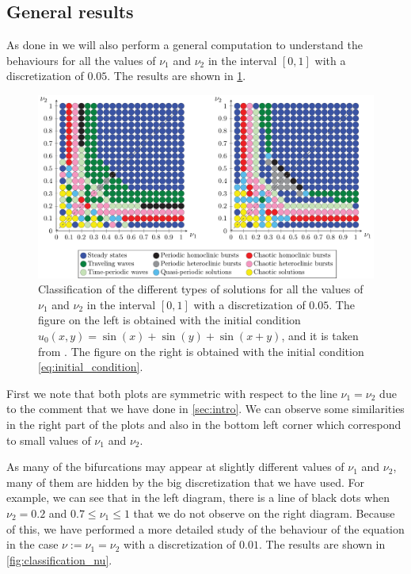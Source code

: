 \documentclass[twoside]{article}
\begin{document}
\subsection{General results}\label{sec:general_results}
As done in \cite{Kalogirou2015} we will also perform a general computation to understand the behaviours for all the values of $\nu_1$ and $\nu_2$ in the interval $[0,1]$ with a discretization of $0.05$. The results are shown in \cref{fig:classification_nu1_nu2}.

\begin{figure}[ht]
  \centering
  \includegraphics[width=\textwidth]{images/nu1-nu2.pdf}
  \caption{Classification of the different types of solutions for all the values of $\nu_1$ and $\nu_2$ in the interval $[0,1]$ with a discretization of $0.05$. The figure on the left is obtained with the initial condition $u_0(x,y) = \sin(x) + \sin(y) + \sin(x+y)$, and it is taken from \cite{Kalogirou2015}. The figure on the right is obtained with the initial condition \cref{eq:initial_condition}.}
  \label{fig:classification_nu1_nu2}
\end{figure}
First we note that both plots are symmetric with respect to the line $\nu_1=\nu_2$ due to the comment that we have done in \cref{sec:intro}. We can observe some similarities in the right part of the plots and also in the bottom left corner which correspond to small values of $\nu_1$ and $\nu_2$.

As many of the bifurcations may appear at slightly different values of $\nu_1$ and $\nu_2$, many of them are hidden by the big discretization that we have used. For example, we can see that in the left diagram, there is a line of black dots when $\nu_2=0.2$ and $0.7\leq \nu_1 \leq 1$ that we do not observe on the right diagram. Because of this, we have performed a more detailed study of the behaviour of the equation in the case $\nu:=\nu_1=\nu_2$ with a discretization of $0.01$. The results are shown in \cref{fig:classification_nu}.
\end{document}

